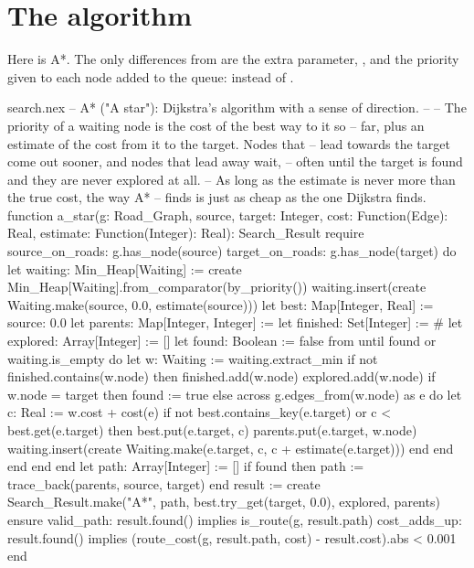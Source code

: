 \section{The algorithm}

Here is A*. The only differences from  are the extra
parameter, , and the priority given to each node added to
the queue:  instead of .

\begin{append}{search.nex}
-- A* ("A star"): Dijkstra's algorithm with a sense of direction.
--
-- The priority of a waiting node is the cost of the best way to it so
-- far, plus an estimate of the cost from it to the target. Nodes that
-- lead towards the target come out sooner, and nodes that lead away wait,
-- often until the target is found and they are never explored at all.
-- As long as the estimate is never more than the true cost, the way A*
-- finds is just as cheap as the one Dijkstra finds.
function a_star(g: Road_Graph, source, target: Integer,
  cost: Function(Edge): Real, estimate: Function(Integer): Real): Search_Result
require
  source_on_roads: g.has_node(source)
  target_on_roads: g.has_node(target)
do
  let waiting: Min_Heap[Waiting] := create Min_Heap[Waiting].from_comparator(by_priority())
  waiting.insert(create Waiting.make(source, 0.0, estimate(source)))
  let best: Map[Integer, Real] := {source: 0.0}
  let parents: Map[Integer, Integer] := {}
  let finished: Set[Integer] := #{}
  let explored: Array[Integer] := []
  let found: Boolean := false
  from
  until
    found or waiting.is_empty
  do
    let w: Waiting := waiting.extract_min
    if not finished.contains(w.node) then
      finished.add(w.node)
      explored.add(w.node)
      if w.node = target then
        found := true
      else
        across g.edges_from(w.node) as e do
          let c: Real := w.cost + cost(e)
          if not best.contains_key(e.target) or c < best.get(e.target) then
            best.put(e.target, c)
            parents.put(e.target, w.node)
            waiting.insert(create Waiting.make(e.target, c, c + estimate(e.target)))
          end
        end
      end
    end
  end
  let path: Array[Integer] := []
  if found then
    path := trace_back(parents, source, target)
  end
  result := create Search_Result.make("A*", path,
    best.try_get(target, 0.0), explored, parents)
ensure
  valid_path: result.found() implies is_route(g, result.path)
  cost_adds_up: result.found()
    implies (route_cost(g, result.path, cost) - result.cost).abs < 0.001
end
\end{append}


